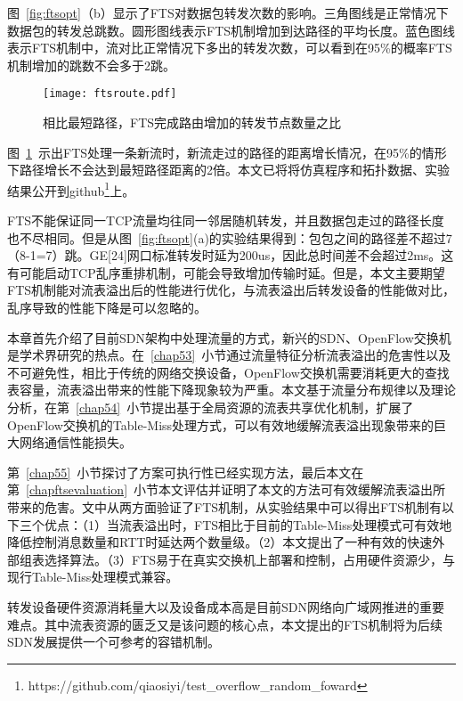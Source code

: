 图~\ref{fig:ftsopt}（b）显示了FTS对数据包转发次数的影响。三角图线是正常情况下数据包的转发总跳数。圆形图线表示FTS机制增加到达路径的平均长度。蓝色图线表示FTS机制中，流对比正常情况下多出的转发次数，可以看到在95\%的概率FTS机制增加的跳数不会多于2跳。

\begin{figure}[!ht]
	\centering 
	\vspace{-1.5mm} 
	\texttt{[image: ftsroute.pdf]}
	\caption{相比最短路径，FTS完成路由增加的转发节点数量之比} \label{fig:ftsroute}
\end{figure}

图~\ref{fig:ftsroute}~示出FTS处理一条新流时，新流走过的路径的距离增长情况，在95\%的情形下路径增长不会达到最短路径距离的2倍。本文已将将仿真程序和拓扑数据、实验结果公开到github\footnote{https://github.com/qiaosiyi/test\_overflow\_random\_foward}上。



FTS不能保证同一TCP流量均往同一邻居随机转发，并且数据包走过的路径长度也不尽相同。但是从图~\ref{fig:ftsopt}(a)的实验结果得到：包包之间的路径差不超过7（8-1=7）跳。GE[24]网口标准转发时延为200us，因此总时间差不会超过2ms。这有可能启动TCP乱序重排机制，可能会导致增加传输时延。但是，本文主要期望FTS机制能对流表溢出后的性能进行优化，与流表溢出后转发设备的性能做对比，乱序导致的性能下降是可以忽略的。


本章首先介绍了目前SDN架构中处理流量的方式，新兴的SDN、OpenFlow交换机是学术界研究的热点。在~\ref{chap53}~小节通过流量特征分析流表溢出的危害性以及不可避免性，相比于传统的网络交换设备，OpenFlow交换机需要消耗更大的查找表容量，流表溢出带来的性能下降现象较为严重。本文基于流量分布规律以及理论分析，在第~\ref{chap54}~小节提出基于全局资源的流表共享优化机制，扩展了OpenFlow交换机的Table-Miss处理方式，可以有效地缓解流表溢出现象带来的巨大网络通信性能损失。

第~\ref{chap55}~小节探讨了方案可执行性已经实现方法，最后本文在第~\ref{chapftsevaluation}~小节本文评估并证明了本文的方法可有效缓解流表溢出所带来的危害。文中从两方面验证了FTS机制，从实验结果中可以得出FTS机制有以下三个优点：（1）当流表溢出时，FTS相比于目前的Table-Miss处理模式可有效地降低控制消息数量和RTT时延达两个数量级。（2）本文提出了一种有效的快速外部组表选择算法。（3）FTS易于在真实交换机上部署和控制，占用硬件资源少，与现行Table-Miss处理模式兼容。

转发设备硬件资源消耗量大以及设备成本高是目前SDN网络向广域网推进的重要难点。其中流表资源的匮乏又是该问题的核心点，本文提出的FTS机制将为后续SDN发展提供一个可参考的容错机制。






